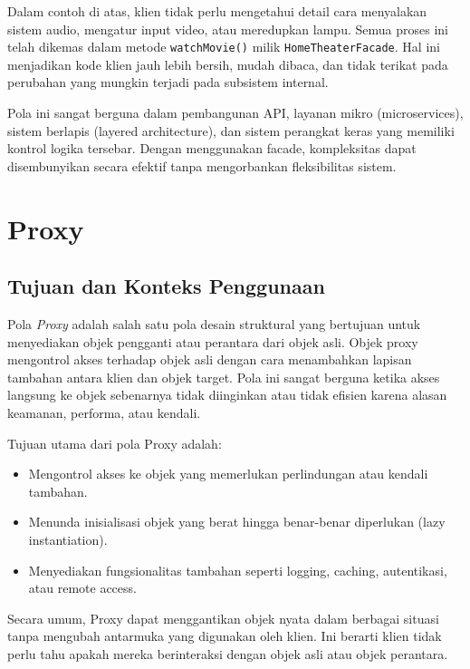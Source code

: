 Dalam contoh di atas, klien tidak perlu mengetahui detail cara menyalakan sistem audio, mengatur input video, atau meredupkan lampu. Semua proses ini telah dikemas dalam metode \texttt{watchMovie()} milik \texttt{HomeTheaterFacade}. Hal ini menjadikan kode klien jauh lebih bersih, mudah dibaca, dan tidak terikat pada perubahan yang mungkin terjadi pada subsistem internal.

Pola ini sangat berguna dalam pembangunan API, layanan mikro (microservices), sistem berlapis (layered architecture), dan sistem perangkat keras yang memiliki kontrol logika tersebar. Dengan menggunakan facade, kompleksitas dapat disembunyikan secara efektif tanpa mengorbankan fleksibilitas sistem.


\section{Proxy}

\subsection{Tujuan dan Konteks Penggunaan}

Pola \textit{Proxy} adalah salah satu pola desain struktural yang bertujuan untuk menyediakan objek pengganti atau perantara dari objek asli. Objek proxy mengontrol akses terhadap objek asli dengan cara menambahkan lapisan tambahan antara klien dan objek target. Pola ini sangat berguna ketika akses langsung ke objek sebenarnya tidak diinginkan atau tidak efisien karena alasan keamanan, performa, atau kendali.

Tujuan utama dari pola Proxy adalah:
\begin{itemize}
	\item Mengontrol akses ke objek yang memerlukan perlindungan atau kendali tambahan.
	\item Menunda inisialisasi objek yang berat hingga benar-benar diperlukan (lazy instantiation).
	\item Menyediakan fungsionalitas tambahan seperti logging, caching, autentikasi, atau remote access.
\end{itemize}

Secara umum, Proxy dapat menggantikan objek nyata dalam berbagai situasi tanpa mengubah antarmuka yang digunakan oleh klien. Ini berarti klien tidak perlu tahu apakah mereka berinteraksi dengan objek asli atau objek perantara.


